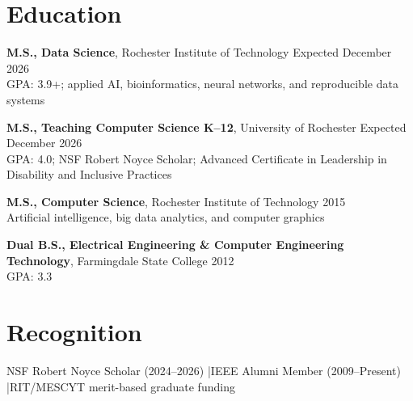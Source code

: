 \documentclass[10pt,letterpaper]{article}
\begin{document}
\section*{Education}
\textbf{M.S., Data Science}, Rochester Institute of Technology
\hfill Expected December 2026\\
GPA: 3.9+; applied AI, bioinformatics, neural networks, and reproducible data systems

\textbf{M.S., Teaching Computer Science K--12}, University of Rochester
\hfill Expected December 2026\\
GPA: 4.0; NSF Robert Noyce Scholar; Advanced Certificate in Leadership in
Disability and Inclusive Practices

\textbf{M.S., Computer Science}, Rochester Institute of Technology
\hfill 2015\\
Artificial intelligence, big data analytics, and computer graphics

\textbf{Dual B.S., Electrical Engineering \& Computer Engineering Technology},
Farmingdale State College \hfill 2012\\
GPA: 3.3

\section*{Recognition}
NSF Robert Noyce Scholar (2024--2026)
\enspace|\enspace IEEE Alumni Member (2009--Present)
\enspace|\enspace RIT/MESCYT merit-based graduate funding
\end{document}
